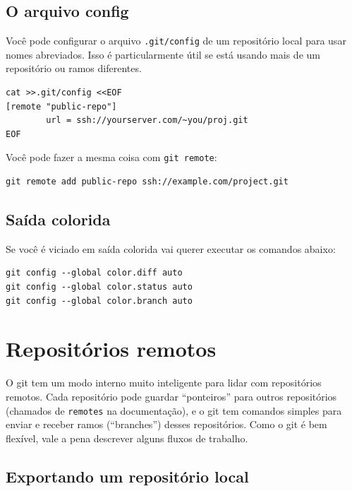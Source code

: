 \documentclass[12pt,brazil]{book}
\begin{document}
\subsection{O arquivo config}
\label{sec:o-arquivo-config}

Você pode configurar o arquivo \texttt{.git/config} de um repositório
local para usar nomes abreviados. Isso é particularmente útil se está
usando mais de um repositório ou ramos diferentes.

\begin{verbatim}
cat >>.git/config <<EOF
[remote "public-repo"]
        url = ssh://yourserver.com/~you/proj.git
EOF
\end{verbatim}

Você pode fazer a mesma coisa com \texttt{git remote}:

\begin{verbatim}
git remote add public-repo ssh://example.com/project.git
\end{verbatim}

\subsection{Saída colorida}
\label{sec:saida-colorida}

Se você é viciado em saída colorida vai querer executar os comandos abaixo:

\begin{verbatim}
git config --global color.diff auto
git config --global color.status auto
git config --global color.branch auto
\end{verbatim}

\section{Repositórios remotos}
\label{sec:remote}


O git tem um modo interno muito inteligente para lidar com
repositórios remotos. Cada repositório pode guardar ``ponteiros'' para
outros repositórios (chamados de \texttt{remotes} na documentação), e
o git tem comandos simples para enviar e receber ramos (``branches'')
desses repositórios. Como o git é bem flexível, vale a pena descrever
alguns fluxos de trabalho.

\subsection{Exportando um repositório local}
\label{sec:export-local}
\end{document}
